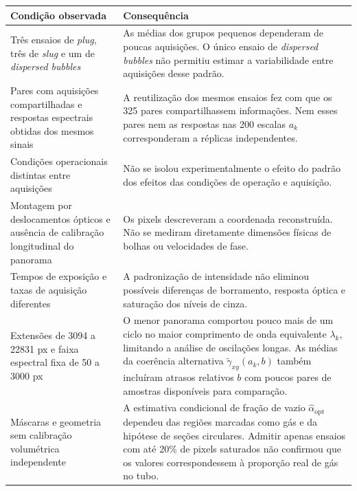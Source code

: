 \begin{quadro}[!htbp]
  \centering
  \begin{threeparttable}
  \caption[Limitações observadas e consequências para a interpretação.]{Limitações
  observadas e consequências para a interpretação, com base nas condições
  de aquisição e nos procedimentos de análise.}
  \label{quad:disc-limites}
  \small
  \begin{tabular}{>{\raggedright\arraybackslash}p{} >{\raggedright\arraybackslash}p{}}
    \hline
    \textbf{Condição observada} & \textbf{Consequência}\\
    \hline
    Três ensaios de \textit{plug}, três de \textit{slug} e um de \textit{dispersed bubbles} &
    As médias dos grupos pequenos dependeram de poucas aquisições.
    O único ensaio de \textit{dispersed bubbles} não permitiu estimar a variabilidade
    entre aquisições desse padrão.\\
    \hline
    Pares com aquisições compartilhadas e respostas espectrais obtidas dos mesmos sinais &
    A reutilização dos mesmos ensaios fez com que os 325 pares compartilhassem
    informações. Nem esses pares nem as respostas nas 200 escalas $a_k$
    corresponderam a réplicas independentes.\\
    \hline
    Condições operacionais distintas entre aquisições &
    Não se isolou experimentalmente o efeito do padrão dos efeitos
    das condições de operação e aquisição.\\
    \hline
    Montagem por deslocamentos ópticos e ausência de calibração longitudinal do panorama &
    Os pixels descreveram a coordenada reconstruída. Não se mediram
    diretamente dimensões físicas de bolhas ou velocidades de fase.\\
    \hline
    Tempos de exposição e taxas de aquisição diferentes &
    A padronização de intensidade não eliminou possíveis diferenças
    de borramento, resposta óptica e saturação dos níveis de cinza.\\
    \hline
    Extensões de 3094 a 22831 px e faixa espectral fixa de 50 a 3000 px &
    O menor panorama comportou pouco mais de um ciclo no maior comprimento
    de onda equivalente $\lambda_k$, limitando a análise de oscilações longas.
    As médias da coerência alternativa $\widetilde\gamma_{xy}(a_k,b)$ também
    incluíram atrasos relativos $b$ com poucos pares de amostras disponíveis
    para comparação.\\
    \hline
    Máscaras e geometria sem calibração volumétrica independente &
    A estimativa condicional de fração de vazio $\widehat\alpha_{\mathrm{opt}}$
    dependeu das regiões marcadas como gás e da hipótese de seções circulares.
    Admitir apenas ensaios com até 20\% de pixels saturados não confirmou
    que os valores correspondessem à proporção real de gás no tubo.\\
    \hline
  \end{tabular}
  \end{threeparttable}
\end{quadro}
\FloatBarrier

